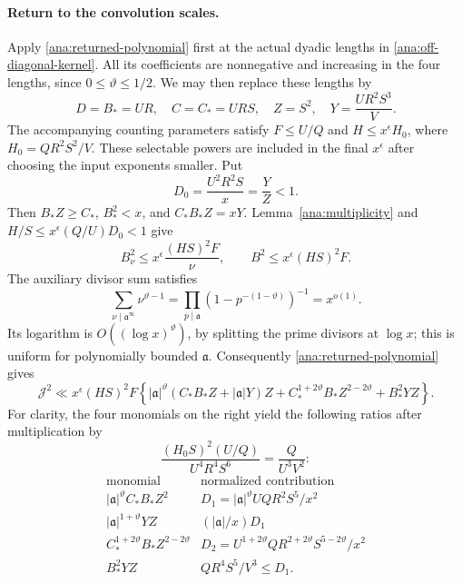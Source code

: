 \paragraph{Return to the convolution scales.}
Apply \eqref{ana:returned-polynomial} first at the actual dyadic
lengths in \eqref{ana:off-diagonal-kernel}. All its coefficients are
nonnegative and increasing in the four lengths, since
$0\le\vartheta\le1/2$. We may then replace these lengths by
\begin{equation}\label{ana:scale-substitution}
 D=B_*=UR,\quad C=C_*=URS,\quad Z=S^2,\quad
 Y=\frac{UR^2S^3}{V}.
\end{equation}
The accompanying counting parameters satisfy
$F\le U/Q$ and $H\le x^\epsilon H_0$, where
$H_0=QR^2S^2/V$. These selectable powers are included in the final
$x^\epsilon$ after choosing the input exponents smaller. Put
\[
 D_0=\frac{U^2R^2S}{x}=\frac YZ<1.
\]
Then $B_*Z\ge C_*$, $B_*^2<x$, and $C_*B_*Z=xY$.
Lemma~\ref{ana:multiplicity} and
$H/S\le x^\epsilon(Q/U)D_0<1$ give
\begin{equation}\label{ana:norm-insertion}
 B_\nu^2\le x^\epsilon\frac{(HS)^2F}{\nu},\qquad
 B^2\le x^\epsilon(HS)^2F.
\end{equation}
The auxiliary divisor sum satisfies
\[
 \sum_{\nu\mid\mathfrak a^\infty}\nu^{\vartheta-1}
 =\prod_{p\mid\mathfrak a}(1-p^{-(1-\vartheta)})^{-1}
 =x^{o(1)}.
\]
Its logarithm is $O((\log x)^\vartheta)$, by splitting the prime
divisors at $\log x$; this is uniform for polynomially bounded
$\mathfrak a$. Consequently \eqref{ana:returned-polynomial} gives
\begin{equation}\label{ana:J-reduced}
 \mathcal J^2\ll x^\epsilon(HS)^2F
 \left\{
 |\mathfrak a|^\vartheta(C_*B_*Z+|\mathfrak a|Y)Z
 +C_*^{1+2\vartheta}B_*Z^{2-2\vartheta}
 +B_*^2YZ\right\}.
\end{equation}
For clarity, the four monomials on the right yield the following
ratios after multiplication by
\[
 \frac{(H_0S)^2(U/Q)}{U^4R^4S^6}
                  =\frac{Q}{U^3V^2}:
\]
\begin{equation}\label{ana:ratio-table}
\begin{array}{c|c}
 \text{monomial}&\text{normalized contribution}\\ \hline
 |\mathfrak a|^\vartheta C_*B_*Z^2
     &D_1=|\mathfrak a|^\vartheta UQR^2S^5/x^2\\
 |\mathfrak a|^{1+\vartheta}YZ
     &(|\mathfrak a|/x)D_1\\
 C_*^{1+2\vartheta}B_*Z^{2-2\vartheta}
     &D_2=U^{1+2\vartheta}QR^{2+2\vartheta}S^{5-2\vartheta}/x^2\\
 B_*^2YZ&QR^4S^5/V^3\le D_1.
\end{array}
\end{equation}
